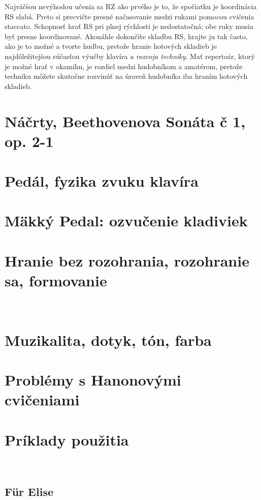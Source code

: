 \documentclass[11pt,a4paper]{book}
\begin{document}
Najväčšou nevýhodou učenia sa RZ ako prvého je to, že spočiatku je koordinácia RS slabá. Preto si precvičte presné načasovanie medzi rukami pomocou cvičenia staccato. Schopnosť hrať RS pri plnej rýchlosti je nedostatočná; obe ruky musia byť presne koordinované. Akonáhle dokončíte skladbu RS, hrajte ju tak často, ako je to možné a tvorte hudbu, pretože hranie hotových skladieb je najdôležitejšou súčasťou výučby klavíra \textit{a rozvoja techniky}. Mať repertoár, ktorý je možné hrať v okamihu, je rozdiel medzi hudobníkom a amatérom, pretože techniku ​​môžete skutočne rozvinúť na úroveň hudobníka iba hraním hotových skladieb.

\section{Náčrty, Beethovenova Sonáta č 1, op. 2-1}\label{s:outlining}

\section{Pedál, fyzika zvuku klavíra}\label{s:damper-pedal}

\section{Mäkký Pedal: ozvučenie kladiviek}\label{s:soft-pedal}

\section{Hranie bez rozohrania, rozohranie sa, formovanie}\label{s:playing-cold}
\ 
\section{Muzikalita, dotyk, tón, farba}\label{s:musicality}

\section{Problémy s Hanonovými cvičeniami}\label{s:problems-hanon}

\section{Príklady použitia}\label{s:examples-applications}
\ 
\subsection{Für Elise}\label{s:fur-elise}
\end{document}
